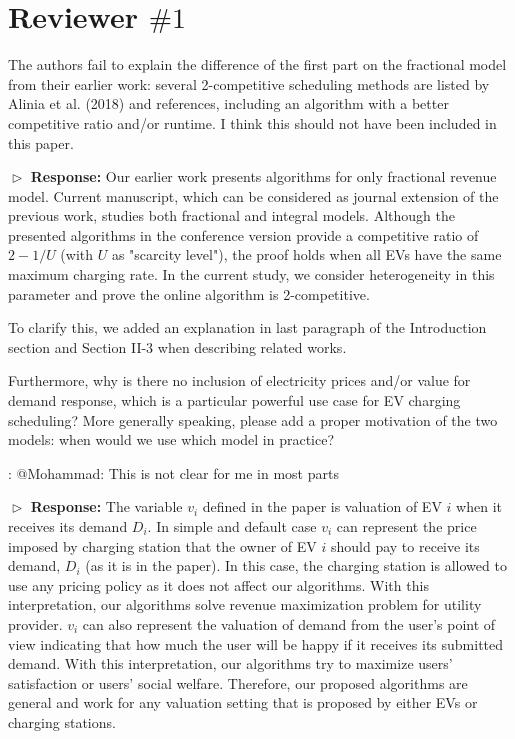 \documentclass[11pt]{article}
\newcommand{\bt}[1]{{\color{red}#1}}%
\newcommand{\bt}[1]{#1}
\begin{document}
\section{Reviewer $\# 1$}

{\color{blue} The authors fail to explain the difference of the first part on the fractional model from their earlier work: several 2-competitive scheduling methods are listed by Alinia et al. (2018) and references, including an algorithm with a better competitive ratio and/or runtime. I think this should not have been included in this paper. }
\vspace{3mm}

$\vartriangleright$ \noindent\textbf{Response:} 
Our earlier work presents algorithms for only fractional revenue model. Current manuscript, which can be considered as journal extension of the previous work, studies both fractional and integral models. Although the presented algorithms in the conference version provide a competitive ratio of $2-1/U$ (with $U$ as "scarcity level"), the proof holds when all EVs have the same maximum charging rate. In the current study, we consider heterogeneity in this parameter and prove the online algorithm is 2-competitive.

\bt{To clarify this, we added an explanation in last paragraph of the Introduction section and Section II-3 when describing related works.   }

\vspace{3mm}
{\color{blue} Furthermore, why is there no inclusion of electricity prices and/or value for demand response, which is a particular powerful use case for EV charging scheduling? More generally speaking, please add a proper motivation of the two models: when would we use which model in practice? }
\vspace{3mm}

{\color{red}: @Mohammad: This is not clear for me in most parts} 

$\vartriangleright$ \noindent\textbf{Response:} 
The variable $v_i$ defined in the paper is valuation of EV $i$ when it receives its demand $D_i$. In simple and default case $v_i$ can represent the price imposed by charging station that the owner of EV $i$ should pay to receive its demand, $D_i$ (as it is in the paper). In this case, the charging station is allowed to use any pricing policy as it does not affect our algorithms. With this interpretation, our algorithms solve revenue maximization problem for utility provider. $v_i$ can also represent the valuation of demand from the user's point of view indicating that how much the user will be happy if it receives its submitted demand. With this interpretation, our algorithms try to maximize users' satisfaction or users' social welfare. Therefore, our proposed algorithms are general and work for any valuation setting that is proposed by either EVs or charging stations.
	
\end{document}
